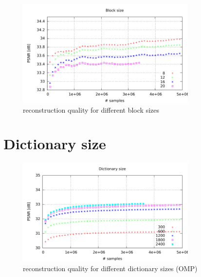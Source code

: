 \begin{figure}[h]
\centering
\includegraphics[width = 0.8\textwidth]{../tests/results/blockSizeConverg.pdf}
\caption{reconstruction quality for different block sizes}
\label{fig:dict size}
\end{figure}


\newpage
\section{Dictionary size}

\begin{figure}[h]
\centering
\includegraphics[width = 0.8\textwidth]{../tests/results/dictSizeOMP.pdf}
\caption{reconstruction quality for different dictionary sizes (OMP)}
\label{fig:dict size}
\end{figure}

